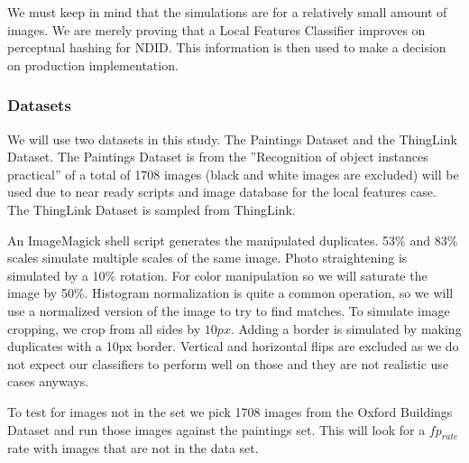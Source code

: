 \documentclass[english,12pt,a4paper,pdftex,elec,utf8, table]{aaltothesis}
\begin{document}
We must keep in mind that the simulations are for a relatively small amount of images. We are merely proving that a Local Features Classifier improves on perceptual hashing for NDID. This information is then used to make a decision on production implementation.

\subsubsection{Datasets}
We will use two datasets in this study. The Paintings Dataset and the ThingLink Dataset. The Paintings Dataset is from the ''Recognition of object instances practical'' \cite{Vedaldi2012} of a total of 1708 images (black and white images are excluded) will be used due to near ready scripts and image database for the local features case. The ThingLink Dataset is sampled from ThingLink.

An ImageMagick shell script generates the manipulated duplicates. 53\% and 83\% scales simulate multiple scales of the same image. Photo straightening is simulated by a 10\% rotation. For color manipulation so we will saturate the image by 50\%. Histogram normalization is quite a common operation, so we will use a normalized version of the image to try to find matches. To simulate image cropping, we crop from all sides by $10px$. Adding a border is simulated by making duplicates with a 10px border. Vertical and horizontal flips are excluded as we do not expect our classifiers to perform well on those and they are not realistic use cases anyways.

To test for images not in the set we pick 1708 images from the Oxford Buildings Dataset \cite{PhilbinJamesArandjelovicReljaZisserman2012} and run those images against the paintings set. This will look for a $fp_{rate}$ rate with images that are not in the data set.
\end{document}
